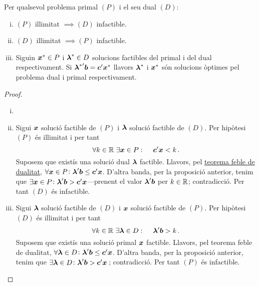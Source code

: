 \begin{col}\label{col:feb}
	Per qualsevol problema primal $(P)$ i el seu dual $(D)$: 
	\begin{enumerate}[i)]
		\item $\left(P\right)$ il\lgem limitat $\implies \left(D\right)$ 
		infactible.
		\item $\left(D\right)$ il\lgem limitat $\implies \left(P\right)$ 
		infactible.
		\item Siguin $\boldsymbol{\boldsymbol{x}}^\ast \in P$ i $\boldsymbol{\boldsymbol{\lambda}}^\ast \in D$
		solucions factibles del primal i del dual respectivament. Si
		${\boldsymbol{\boldsymbol{\lambda}}^\ast}'\boldsymbol{b} = \boldsymbol{\boldsymbol{c}}'\boldsymbol{\boldsymbol{x}}^\ast$ llavors
		$\boldsymbol{\boldsymbol{\lambda}}^\ast$ i $\boldsymbol{\boldsymbol{x}}^\ast$ són solucions òptimes pel 
		problema
		dual i primal respectivament.
	\end{enumerate}
	\begin{proof}
		\begin{enumerate}[i)]
			\item[]
			\item Sigui $\boldsymbol{\boldsymbol{x}}$ solució factible de $(P)$ i 
			$\boldsymbol{\boldsymbol{\lambda}}$
			solució factible de $(D)$. Per hipòtesi $(P)$ és il\lgem limitat i 
			per 
			tant \[\forall
			k \in \mathbb{R}\ \exists \boldsymbol{x}\in P\operatorname{\colon\quad} \boldsymbol{c}'\boldsymbol{x} < k\,. \] 
			Suposem que
			existís una solució dual $\boldsymbol{\lambda}$ factible. Llavors, pel
			\hyperref[teo:dualitat-feble]{teorema feble de dualitat}, $\forall
			\boldsymbol{\boldsymbol{x}}\in P\colon \boldsymbol{\boldsymbol{\lambda}}'\boldsymbol{b} \le 
			\boldsymbol{\boldsymbol{c}}'\boldsymbol{\boldsymbol{x}}$.
			D'altra banda, per la proposició anterior, tenim que $\exists 
			\boldsymbol{\boldsymbol{x}}\in
			P\colon \boldsymbol{\boldsymbol{\lambda}}'\boldsymbol{b} > 
			\boldsymbol{\boldsymbol{c}}'\boldsymbol{\boldsymbol{x}}$---prenent el valor
			$\boldsymbol{\boldsymbol{\lambda}}'\boldsymbol{b}$ per $k\in\mathbb{R}$; contradicció. Per tant 
			$(D)$ és
			infactible.
			\item Sigui $\boldsymbol{\boldsymbol{\lambda}}$ solució factible de $(D)$ i 
			$\boldsymbol{\boldsymbol{x}}$
			solució factible de $(P)$. Per hipòtesi $(D)$ és il\lgem limitat i 
			per 
			tant \[\forall
			k \in \mathbb{R}\ \exists \boldsymbol{\lambda}\in D\operatorname{\colon\quad} 
			\boldsymbol{\boldsymbol{\lambda}}'\boldsymbol{b} > k\,. \]
			Suposem que existís una solució primal $\boldsymbol{\boldsymbol{x}}$ factible. 
			Llavors, pel
			{teorema feble de dualitat}, $\forall \boldsymbol{\boldsymbol{\lambda}}\in D\colon
			\boldsymbol{\boldsymbol{\lambda}}'\boldsymbol{b} \le \boldsymbol{\boldsymbol{c}}'\boldsymbol{\boldsymbol{x}}$. D'altra 
			banda, per la
			proposició anterior, tenim que $\exists \boldsymbol{\lambda}\in D\colon
			\boldsymbol{\lambda}'\boldsymbol{b} > \boldsymbol{c}'\boldsymbol{x}\,$; contradicció. Per tant 
			$(P)$ és
			infactible.

\end{enumerate}
\end{proof}
\end{col}
